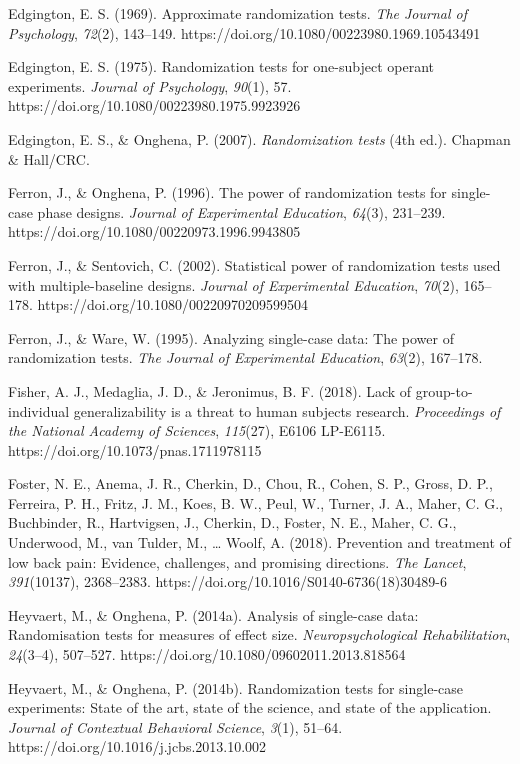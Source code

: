 \documentclass{article}
\begin{document}
Edgington, E. S. (1969). Approximate randomization tests. \emph{The Journal of Psychology}, \emph{72}(2), 143--149. https://doi.org/10.1080/00223980.1969.10543491

Edgington, E. S. (1975). Randomization tests for one-subject operant experiments. \emph{Journal of Psychology}, \emph{90}(1), 57. https://doi.org/10.1080/00223980.1975.9923926

Edgington, E. S., \& Onghena, P. (2007). \emph{Randomization tests} (4th ed.). Chapman \& Hall/CRC.

Ferron, J., \& Onghena, P. (1996). The power of randomization tests for single-case phase designs. \emph{Journal of Experimental Education}, \emph{64}(3), 231--239. https://doi.org/10.1080/00220973.1996.9943805

Ferron, J., \& Sentovich, C. (2002). Statistical power of randomization tests used with multiple-baseline designs. \emph{Journal of Experimental Education}, \emph{70}(2), 165--178. https://doi.org/10.1080/00220970209599504

Ferron, J., \& Ware, W. (1995). Analyzing single-case data: The power of randomization tests. \emph{The Journal of Experimental Education}, \emph{63}(2), 167--178.

Fisher, A. J., Medaglia, J. D., \& Jeronimus, B. F. (2018). Lack of group-to-individual generalizability is a threat to human subjects research. \emph{Proceedings of the National Academy of Sciences}, \emph{115}(27), E6106 LP-E6115. https://doi.org/10.1073/pnas.1711978115

Foster, N. E., Anema, J. R., Cherkin, D., Chou, R., Cohen, S. P., Gross, D. P., Ferreira, P. H., Fritz, J. M., Koes, B. W., Peul, W., Turner, J. A., Maher, C. G., Buchbinder, R., Hartvigsen, J., Cherkin, D., Foster, N. E., Maher, C. G., Underwood, M., van Tulder, M., … Woolf, A. (2018). Prevention and treatment of low back pain: Evidence, challenges, and promising directions. \emph{The Lancet}, \emph{391}(10137), 2368--2383. https://doi.org/10.1016/S0140-6736(18)30489-6

Heyvaert, M., \& Onghena, P. (2014a). Analysis of single-case data: Randomisation tests for measures of effect size. \emph{Neuropsychological Rehabilitation}, \emph{24}(3--4), 507--527. https://doi.org/10.1080/09602011.2013.818564

Heyvaert, M., \& Onghena, P. (2014b). Randomization tests for single-case experiments: State of the art, state of the science, and state of the application. \emph{Journal of Contextual Behavioral Science}, \emph{3}(1), 51--64. https://doi.org/10.1016/j.jcbs.2013.10.002
\end{document}
